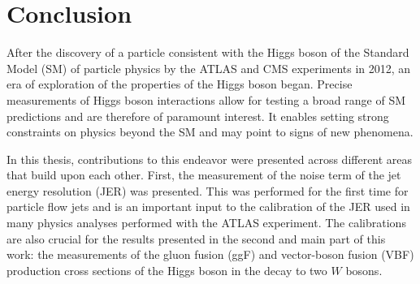 \chapter{Conclusion}
\label{chap:conclusion}

After the discovery of a particle consistent with the Higgs boson of the Standard Model (SM) of particle physics by the ATLAS and CMS experiments in 2012, an era of exploration of the properties of the Higgs boson began.
Precise measurements of Higgs boson interactions allow for testing a broad range of SM predictions and are therefore of paramount interest.
It enables setting strong constraints on physics beyond the SM and may point to signs of new phenomena. %

In this thesis, contributions to this endeavor were presented across different areas that build upon each other. 
First, the measurement of the noise term of the jet energy resolution (JER) was presented. 
This was performed for the first time for particle flow jets and is an important input to the calibration of the JER used in many physics analyses performed with the ATLAS experiment. 
The calibrations are also crucial for the results presented in the second and main part of this work: the measurements of the gluon fusion (ggF) and vector-boson fusion (VBF) production cross sections of the Higgs boson in the decay to two $W$ bosons.

